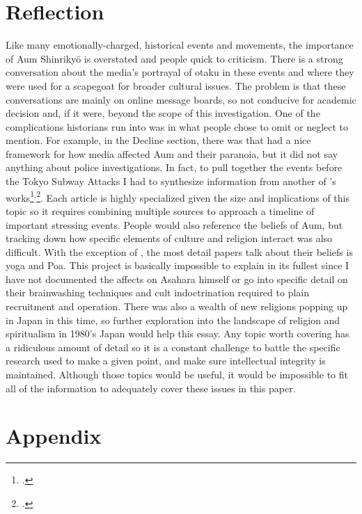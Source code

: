 \documentclass[12pt, letterpaper]{article}
\newcommand{\poses}[1]{#1's}
\begin{document}
\section{Reflection}
Like many emotionally-charged, historical events and movements, the importance of Aum Shinriky\=o is overstated and
people quick to criticism. There is a strong conversation about the media's portrayal of otaku in these 
events and where they were used for a scapegoat for broader cultural issues. The problem is that these
conversations are mainly on online message boards, so not conducive for academic decision and, if it were,
beyond the scope of this investigation. One of the complications historians run into was in what people chose to omit
or neglect to mention. For example, in the Decline section, there was  
that had a nice framework for how media affected Aum and their paranoia, but it did not say anything about
police investigations. In fact, to pull together the events before the Tokyo Subway Attacks I had to
synthesize information from another of \poses{\citeauthor{watanabe_reactions_1997}}
works\footcite{watanabe_reactions_1997}\textsuperscript{,}\footcite{watanabe_religion_1998}. Each article is
highly specialized given the size and implications of this topic so it requires combining multiple sources to
approach a timeline of important stressing events. People would also reference the beliefs of Aum, but
tracking down how specific elements of culture and religion interact was also difficult. With the exception
of , the most detail papers talk about their beliefs is yoga and Poa. This
project is basically impossible to explain in its fullest since I have not documented the affects on Asahara
himself or go into specific detail on their brainwashing techniques and cult indoctrination required to plain
recruitment and operation. There was also a wealth of new religions popping up in Japan in this time, so
further exploration into the landscape of religion and spiritualism in \poses{1980} Japan would help this
essay. Any topic worth covering has a ridiculous amount of detail so it is a constant
challenge to battle the specific research used to make a given point, and make sure intellectual integrity is
maintained. Although those topics would be useful, it would be impossible to fit all of the information to
adequately cover these issues in this paper.
\newpage
\printbibliography{}
\newpage
\section*{Appendix}
\listoffigures{}
\end{document}
